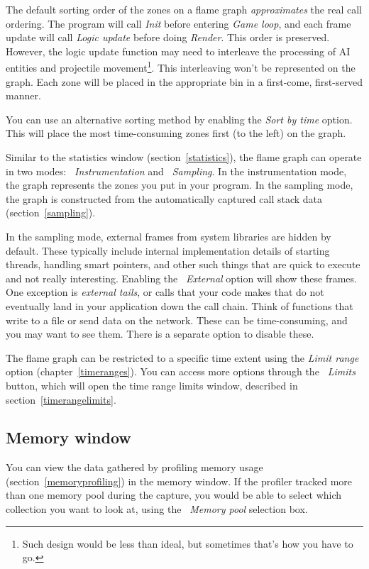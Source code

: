 \documentclass[hidelinks,titlepage,a4paper,twoside]{article}
\begin{document}
The default sorting order of the zones on a flame graph \emph{approximates} the real call ordering. The program will call \emph{Init} before entering \emph{Game loop}, and each frame update will call \emph{Logic update} before doing \emph{Render}. This order is preserved. However, the logic update function may need to interleave the processing of AI entities and projectile movement\footnote{Such design would be less than ideal, but sometimes that's how you have to go.}. This interleaving won't be represented on the graph. Each zone will be placed in the appropriate bin in a first-come, first-served manner.

You can use an alternative sorting method by enabling the \emph{Sort by time} option. This will place the most time-consuming zones first (to the left) on the graph.

Similar to the statistics window (section~\ref{statistics}), the flame graph can operate in two modes: \emph{\faSyringe{}~Instrumentation} and \emph{\faEyeDropper{}~Sampling}. In the instrumentation mode, the graph represents the zones you put in your program. In the sampling mode, the graph is constructed from the automatically captured call stack data (section~\ref{sampling}).

In the sampling mode, external frames from system libraries are hidden by default. These typically include internal implementation details of starting threads, handling smart pointers, and other such things that are quick to execute and not really interesting. Enabling the \emph{\faShieldHalved{}~External} option will show these frames. One exception is \emph{external tails}, or calls that your code makes that do not eventually land in your application down the call chain. Think of functions that write to a file or send data on the network. These can be time-consuming, and you may want to see them. There is a separate option to disable these.

The flame graph can be restricted to a specific time extent using the \emph{Limit range} option (chapter~\ref{timeranges}). You can access more options through the \emph{\faRuler{}~Limits} button, which will open the time range limits window, described in section~\ref{timerangelimits}.

\subsection{Memory window}
\label{memorywindow}

You can view the data gathered by profiling memory usage (section~\ref{memoryprofiling}) in the memory window. If the profiler tracked more than one memory pool during the capture, you would be able to select which collection you want to look at, using the \emph{\faBoxArchive{}~Memory pool} selection box.
\end{document}
